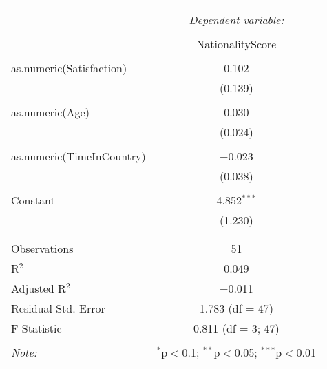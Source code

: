 \documentclass{article}
\begin{document}
\begin{table}[!htbp] \centering 
  \caption{} 
  \label{} 
\begin{tabular}{@{\extracolsep{5pt}}lc} 
\\[-1.8ex]\hline 
\hline \\[-1.8ex] 
 & \multicolumn{1}{c}{\textit{Dependent variable:}} \\ 
\cline{2-2} 
\\[-1.8ex] & NationalityScore \\ 
\hline \\[-1.8ex] 
 as.numeric(Satisfaction) & 0.102 \\ 
  & (0.139) \\ 
  & \\ 
 as.numeric(Age) & 0.030 \\ 
  & (0.024) \\ 
  & \\ 
 as.numeric(TimeInCountry) & $-$0.023 \\ 
  & (0.038) \\ 
  & \\ 
 Constant & 4.852$^{***}$ \\ 
  & (1.230) \\ 
  & \\ 
\hline \\[-1.8ex] 
Observations & 51 \\ 
R$^{2}$ & 0.049 \\ 
Adjusted R$^{2}$ & $-$0.011 \\ 
Residual Std. Error & 1.783 (df = 47) \\ 
F Statistic & 0.811 (df = 3; 47) \\ 
\hline 
\hline \\[-1.8ex] 
\textit{Note:}  & \multicolumn{1}{r}{$^{*}$p$<$0.1; $^{**}$p$<$0.05; $^{***}$p$<$0.01} \\ 
\end{tabular} 
\end{table} 
\end{document}
